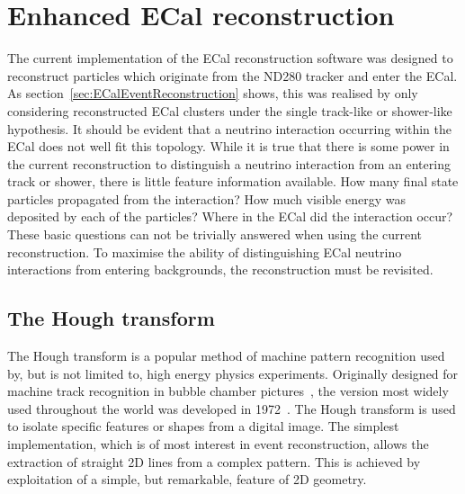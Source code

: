 \chapter{Enhanced ECal reconstruction}
\label{chap:EnhancedECalReconstruction}
The current implementation of the ECal reconstruction software was designed to reconstruct particles which originate from the ND280 tracker and enter the ECal.  As section~\ref{sec:ECalEventReconstruction} shows, this was realised by only considering reconstructed ECal clusters under the single track-like or shower-like hypothesis.  It should be evident that a neutrino interaction occurring within the ECal does not well fit this topology.  While it is true that there is some power in the current reconstruction to distinguish a neutrino interaction from an entering track or shower, there is little feature information available.  How many final state particles propagated from the interaction?  How much visible energy was deposited by each of the particles?  Where in the ECal did the interaction occur?  These basic questions can not be trivially answered when using the current reconstruction.  To maximise the ability of distinguishing ECal neutrino interactions from entering backgrounds, the reconstruction must be revisited.

\section{The Hough transform}
\label{sec:HoughTransform}
The Hough transform is a popular method of machine pattern recognition used by, but is not limited to, high energy physics experiments.  Originally designed for machine track recognition in bubble chamber pictures~\cite{Hough:1959qva}, the version most widely used throughout the world was developed in 1972~\cite{Duda:1972:UHT:361237.361242}.  The Hough transform is used to isolate specific features or shapes from a digital image.  The simplest implementation, which is of most interest in event reconstruction, allows the extraction of straight 2D lines from a complex pattern.  This is achieved by exploitation of a simple, but remarkable, feature of 2D geometry.

